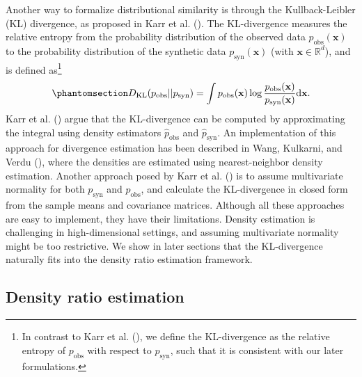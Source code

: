 \documentclass[
]{article}
\newcommand{\pobs}{p_{\text{obs}}}
\newcommand{\psyn}{p_{\text{syn}}}
\newcommand{\bx}{\mathbf{x}}
\begin{document}
Another way to formalize distributional similarity is through the
Kullback-Leibler (KL) divergence, as proposed in Karr et al.
(). The KL-divergence measures the
relative entropy from the probability distribution of the observed data
\(\pobs(\bx)\) to the probability distribution of the synthetic data
\(\psyn(\bx)\) (with \(\bx \in \mathbb{R}^{d}\)), and is defined
as\footnote{In contrast to Karr et al.
  (), we define the KL-divergence
  as the relative entropy of \(\pobs\) with respect to \(\psyn\), such
  that it is consistent with our later formulations.}
\begin{equation}\phantomsection\label{eq-kl-div}{
D_{\text{KL}}(\pobs || \psyn) = 
\int \pobs(\bx) \log \frac{\pobs(\bx)}{\psyn(\bx)} \text{d} \bx.
}\end{equation} Karr et al. ()
argue that the KL-divergence can be computed by approximating the
integral using density estimators \(\hat{p}_\text{obs}\) and
\(\hat{p}_\text{syn}\). An implementation of this approach for
divergence estimation has been described in Wang, Kulkarni, and Verdu
(), where the densities are
estimated using nearest-neighbor density estimation. Another approach
posed by Karr et al. () is to
assume multivariate normality for both \(\psyn\) and \(\pobs\), and
calculate the KL-divergence in closed form from the sample means and
covariance matrices. Although all these approaches are easy to
implement, they have their limitations. Density estimation is
challenging in high-dimensional settings, and assuming multivariate
normality might be too restrictive. We show in later sections that the
KL-divergence naturally fits into the density ratio estimation
framework.

\subsection{Density ratio estimation}\label{density-ratio-estimation}
\end{document}
